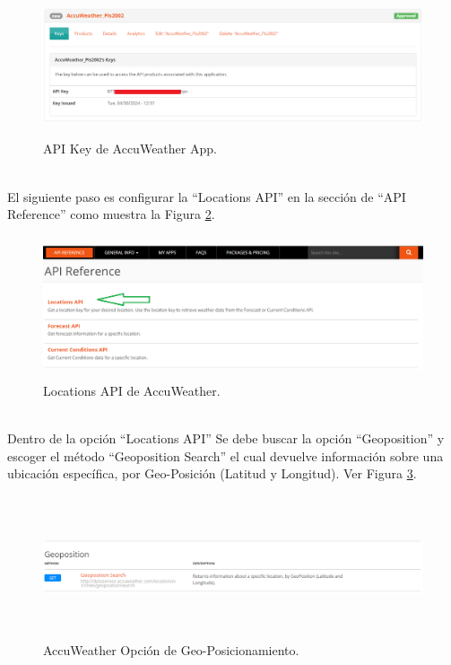 \documentclass[a4paper,10pt, oneside, titlepage]{article}
\begin{document}
	\begin{figure}[!h]
		\centering
		\includegraphics[width = 1\linewidth, height = 4.2cm]{Api_Key_AccuWeather.png}
		\caption{API Key de AccuWeather App.}
		\label{Api_Key_AccuWeather}
	\end{figure} \\
	\indent El siguiente paso es configurar la ``Locations API'' en la sección de ``API Reference'' como muestra la Figura \ref{Locations_API_AccuWeather}.
	\begin{figure}[!h]
		\centering
		\includegraphics[width = 1\linewidth, height = 4.2cm]{Locations_API_AccuWeather.png}
		\caption{Locations API de AccuWeather.}
		\label{Locations_API_AccuWeather}
	\end{figure} \\
	\indent Dentro de la opción ``Locations API'' Se debe buscar la opción ``Geoposition'' y escoger el método ``Geoposition Search'' el cual devuelve información sobre una ubicación específica, por Geo-Posición (Latitud y Longitud). Ver Figura \ref{AccuWeather_Geoposition_Option}.
	\begin{figure}[!h]
		\centering
		\includegraphics[width = 1\linewidth, height = 4.2cm]{AccuWeather_Geoposition_Option.png}
		\caption{AccuWeather Opción de Geo-Posicionamiento.}
		\label{AccuWeather_Geoposition_Option}
	\end{figure} \\
\end{document}
